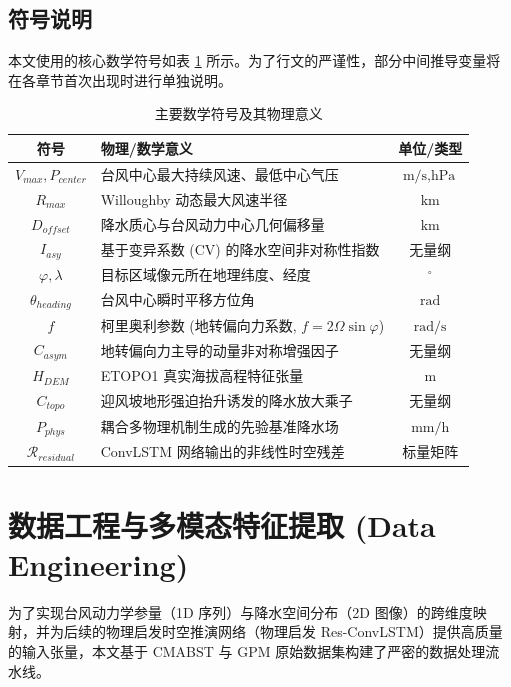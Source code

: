 \documentclass[12pt,a4paper]{ctexart}
\begin{document}
\subsection{符号说明}
本文使用的核心数学符号如表 \ref{tab:symbols} 所示。为了行文的严谨性，部分中间推导变量将在各章节首次出现时进行单独说明。

\begin{table}[H]
    \centering
    \caption{主要数学符号及其物理意义}
    \label{tab:symbols}
    \begin{tabular}{clc}
        \toprule
        \textbf{符号} & \textbf{物理/数学意义} & \textbf{单位/类型} \\
        \midrule
        $V_{max}, P_{center}$ & 台风中心最大持续风速、最低中心气压 & $\text{m/s}, \text{hPa}$ \\
        $R_{max}$ & Willoughby 动态最大风速半径 & $\text{km}$ \\
        $D_{offset}$ & 降水质心与台风动力中心几何偏移量 & $\text{km}$ \\
        $I_{asy}$ & 基于变异系数 (CV) 的降水空间非对称性指数 & 无量纲 \\
        $\varphi, \lambda$ & 目标区域像元所在地理纬度、经度 & $^{\circ}$ \\
        $\theta_{heading}$ & 台风中心瞬时平移方位角 & $\text{rad}$ \\
        $f$ & 柯里奥利参数 (地转偏向力系数, $f = 2\Omega \sin \varphi$) & $\text{rad/s}$ \\
        $C_{asym}$ & 地转偏向力主导的动量非对称增强因子 & 无量纲 \\
        $H_{DEM}$ & ETOPO1 真实海拔高程特征张量 & $\text{m}$ \\
        $C_{topo}$ & 迎风坡地形强迫抬升诱发的降水放大乘子 & 无量纲 \\
        $P_{phys}$ & 耦合多物理机制生成的先验基准降水场 & $\text{mm/h}$ \\
        $\mathcal{R}_{residual}$ & ConvLSTM 网络输出的非线性时空残差 & 标量矩阵 \\
        \bottomrule
    \end{tabular}
\end{table}


\newpage
\section{数据工程与多模态特征提取 (Data Engineering)}
为了实现台风动力学参量（1D 序列）与降水空间分布（2D 图像）的跨维度映射，并为后续的物理启发时空推演网络（物理启发 Res-ConvLSTM）提供高质量的输入张量，本文基于 CMABST 与 GPM 原始数据集构建了严密的数据处理流水线。
\end{document}

